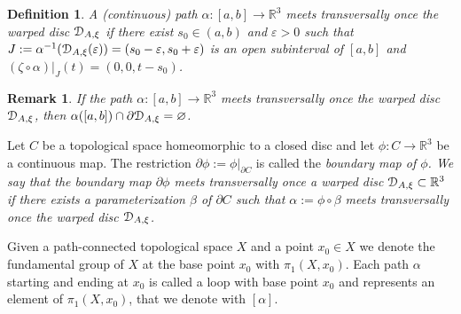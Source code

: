 \documentclass[10pt,twoside]{homg3} %
\newtheorem{defn}[thm]{Definition}
\newtheorem{sremark}[thm]{Remark}
\newcommand{\Dd}{{\EuScript D}}
\renewcommand{\R}{\mathbb{R}}
\begin{document}
\begin{defn}\label{def1}\em
A (continuous) path $\alpha:[a,b]\rightarrow\R^3$ \emph{meets transversally once the warped disc $\Dd_{A,\xi}$} if there exist $s_0\in(a,b)$ and $\varepsilon>0$ such that $J:=\alpha^{-1}(\Dd_{A,\xi}(\varepsilon))=(s_0-\varepsilon,s_0+\varepsilon)$ is an open subinterval of $[a,b]$ and $(\zeta\circ\alpha)|_J(t)=(0,0,t-s_0)$.
\end{defn}

\begin{sremark}\label{rem0}\em
If the path $\alpha:[a,b]\to\R^3$ meets transversally once the warped disc $\Dd_{A,\xi}$, then $\alpha([a,b])\cap\partial\Dd_{A,\xi}=\varnothing$.
\end{sremark}

Let $C$ be a topological space homeomorphic to a closed disc and let $\phi:C\to\R^3$ be a continuous map. The restriction $\partial\phi:=\phi|_{\partial C}$ is called the \em boundary map \em of $\phi$. We say that the boundary map $\partial\phi$ \em meets transversally once \em a warped disc $\Dd_{A,\xi}\subset\R^3$ if there exists a parameterization $\beta$ of $\partial C$ such that $\alpha:=\phi\circ\beta$ meets transversally once the warped disc $\Dd_{A,\xi}$.

Given a path-connected topological space $X$ and a point $x_0\in X$ we denote the fundamental group of $X$ at the base point $x_0$ with $\pi_1(X,x_0)$. Each path $\alpha$ starting and ending at $x_0$ is called a loop with base point $x_0$ and represents an element of $\pi_1(X,x_0)$, that we denote with $[\alpha]$.
\end{document}
